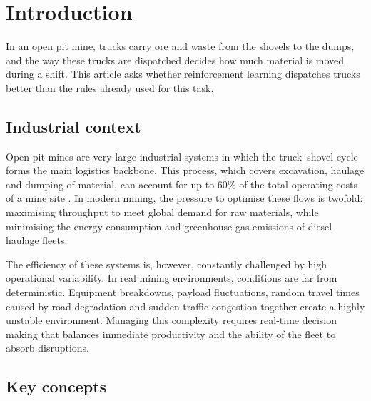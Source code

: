\documentclass[11pt,a4paper]{article}
\newif\ifcorrmarks
\newcommand{\corr}[1]{\ifcorrmarks\textcolor{corrcolor}{#1}\else#1\fi}
\begin{document}
\section{Introduction}
\label{sec:intro}

\corr{In an \corr{open pit} mine, trucks carry ore and waste from the shovels to the dumps, and the way these trucks are dispatched decides how much material is moved during a shift. This article asks whether reinforcement learning dispatches trucks better than the rules already used for this task.}

\subsection{Industrial context}

\corr{Open pit} mines are very large industrial systems in which the truck--shovel cycle forms the main logistics backbone. \corr{This process, which covers excavation, haulage and dumping of material, can account for up to 60\% of the total operating costs of a mine site} \cite{Afrapoli2017}. In modern mining, the pressure to optimise these flows is twofold: maximising throughput to meet global demand for raw materials, while minimising the energy consumption and greenhouse gas emissions of diesel haulage fleets.

The efficiency of these systems is, however, constantly challenged by high operational variability. In real mining environments, conditions are far from deterministic. Equipment breakdowns, payload fluctuations, random travel times caused by road degradation and sudden traffic congestion together create a highly unstable environment. Managing this complexity requires real-time decision making that balances immediate productivity and \corr{the ability of the fleet to absorb disruptions}.

\subsection{Key concepts}
\end{document}
